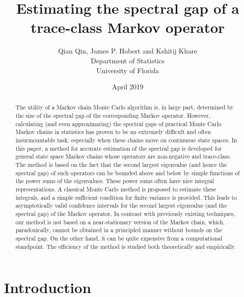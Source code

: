 \documentclass[11pt]{article}
\author{Qian Qin, James P. Hobert and Kshitij Khare \\ Department of Statistics \\ University of
	Florida}
\date{April 2019}
\begin{document}
\title{Estimating the spectral gap of a trace-class Markov operator}
		
	\maketitle
	
	\begin{abstract}
          The utility of a Markov chain Monte Carlo algorithm is, in
          large part, determined by the size of the spectral gap of
          the corresponding Markov operator.  However, calculating
          (and even approximating) the spectral gaps of practical
          Monte Carlo Markov chains in statistics has proven to be an
          extremely difficult and often insurmountable task,
          especially when these chains move on continuous state
          spaces.  In this paper, a method for accurate estimation of
          the spectral gap is developed for general state space Markov
          chains whose operators are non-negative and trace-class.
          The method is based on the fact that the second largest
          eigenvalue (and hence the spectral gap) of such operators
          can be bounded above and below by simple functions of the
          power sums of the eigenvalues.  These power sums often have
          nice integral representations.  A classical Monte Carlo
          method is proposed to estimate these integrals, and a simple
          sufficient condition for finite variance is provided.  This
          leads to asymptotically valid confidence intervals for the
          second largest eigenvalue (and the spectral gap) of the
          Markov operator.  
          In contrast with previously existing techniques, our method is not
          based on a near-stationary version of the Markov chain, which,
          paradoxically, cannot be obtained in a principled manner without bounds on the spectral gap.
          On the other hand, it can be quite expensive from a computational
          standpoint.  The efficiency of the method is studied both theoretically
          and empirically.
	\end{abstract}
	
	\section{Introduction}
	
\end{document}
